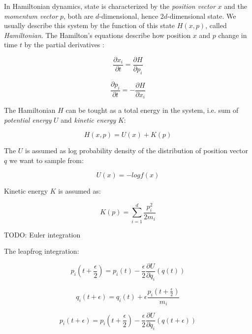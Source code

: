 \documentclass[
  digital, %
  oneside, %
  lof,     %
  lot,     %
]{fithesis4}
\begin{document}
In Hamiltonian dynamics, state is characterized by the
\textit{position vector} $x$ and the \textit{momentum vector} $p$,
both are $d$-dimensional, hence $2d$-dimensional state.
We usually describe this system by the function of
this state $H(x, p)$, called \textit{Hamiltonian}.
The Hamilton’s equations describe how position $x$ and
$p$ change in time $t$ by the partial derivatives \cite{neal2011}:

\begin{equation}
  \frac{\partial x_i}{\partial t} = \frac{\partial H}{\partial p_i}
\end{equation}

\begin{equation}
  \frac{\partial p_i}{\partial t} = - \frac{\partial H}{\partial x_i}
\end{equation}

The Hamiltonian $H$ can be tought as a total energy in the system,
i.e. sum of \textit{potential energy} $U$ and \textit{kinetic energy} $K$:

\begin{equation}
  H(x, p) = U(x) + K(p)
\end{equation}

The $U$ is assumed as log probability density of the distribution
of position vector $q$ we want to sample from:

\begin{equation}
  U(x) = -log f(x)
\end{equation}

Kinetic energy $K$ is assumed as:

\begin{equation}
  K(p) = \sum_{i=1}^{d} \frac{p_i^2}{2 m_i}
\end{equation}

TODO: Euler integration

The leapfrog integration:

\begin{equation}
  p_i \left(t + \frac{\epsilon}{2} \right) = p_i(t) - \frac{\epsilon}{2} \frac{\partial U}{\partial q_i} (q(t))
\end{equation}

\begin{equation}
  q_i(t + \epsilon) = q_i(t) + \epsilon \frac{p_i \left(t + \frac{\epsilon}{2} \right)}{m_i}
\end{equation}

\begin{equation}
  p_i(t + \epsilon) = p_i \left( t + \frac{\epsilon}{2} \right) - \frac{\epsilon}{2} \frac{\partial U}{\partial q_i} \left( q \left( t + \epsilon \right) \right)
\end{equation}
\end{document}
